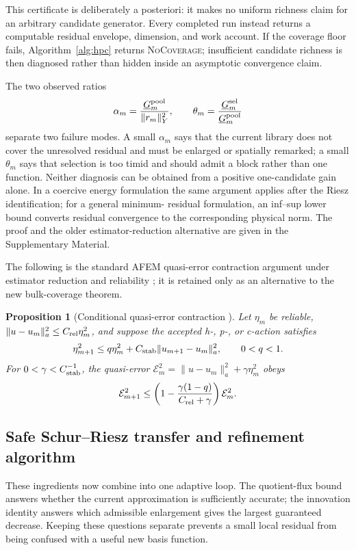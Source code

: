 \documentclass[11pt]{article}
\newtheorem{proposition}[theorem]{Proposition}
\numberwithin{algorithm}{section}
\theoremstyle{definition}\newtheorem{definition}[theorem]{Definition}
\theoremstyle{remark}\newtheorem{remark}[theorem]{Remark}
\begin{document}
This certificate is deliberately a posteriori: it makes no uniform richness
claim for an arbitrary candidate generator. Every completed run instead
returns a computable residual envelope, dimension, and work account. If the
coverage floor fails, Algorithm~\ref{alg:hpc} returns
\textsc{NoCoverage}; insufficient candidate richness is then diagnosed rather
than hidden inside an asymptotic convergence claim.

The two observed ratios
\begin{equation}
 \alpha_m=\frac{\underline G_m^{\rm pool}}{\|r_m\|_Y^2},
 \qquad
 \theta_m=\frac{\underline G_m^{\rm sel}}
 {\underline G_m^{\rm pool}}
 \label{eq:coverage-diagnostics}
\end{equation}
separate two failure modes.  A small $\alpha_m$ says that the current library
does not cover the unresolved residual and must be enlarged or spatially
remarked; a small $\theta_m$ says that selection is too timid and should admit
a block rather than one function.  Neither diagnosis can be obtained from a
positive one-candidate gain alone.  In a coercive energy formulation the same
argument applies after the Riesz identification; for a general minimum-
residual formulation, an inf--sup lower bound converts residual convergence to
the corresponding physical norm.  The proof and the older estimator-reduction
alternative are given in the Supplementary Material.

\secondarytheoryD
The following is the standard AFEM quasi-error contraction argument under
estimator reduction and reliability \cite{casconetal2008}; it is retained only
as an alternative to the new bulk-coverage theorem.
\begin{proposition}[Conditional quasi-error contraction
  {\cite{casconetal2008}}]
\label{prop:main-contraction}
Let $\eta_m$ be reliable,
$\|u-u_m\|_a^2\leq C_{\rm rel}\eta_m^2$, and suppose the accepted h-, p-, or
c-action satisfies
\[
 \eta_{m+1}^2\leq q\eta_m^2+C_{\rm stab}
 \|u_{m+1}-u_m\|_a^2,\qquad 0<q<1.
\]
For $0<\gamma<C_{\rm stab}^{-1}$, the quasi-error
$\mathcal E_m^2=\|u-u_m\|_a^2+\gamma\eta_m^2$ obeys
\begin{equation}
 \mathcal E_{m+1}^2\leq
 \left(1-\frac{\gamma(1-q)}{C_{\rm rel}+\gamma}\right)
 \mathcal E_m^2.
 \label{eq:main-contraction}
\end{equation}
\end{proposition}
\endsecondarytheoryD

\subsection{Safe Schur--Riesz transfer and refinement algorithm}
These ingredients now combine into one adaptive loop.  The quotient-flux bound answers
whether the current approximation is sufficiently accurate; the innovation
identity answers which admissible enlargement gives the largest guaranteed
decrease.  Keeping these questions separate prevents a small local residual
from being confused with a useful new basis function.
\end{document}
